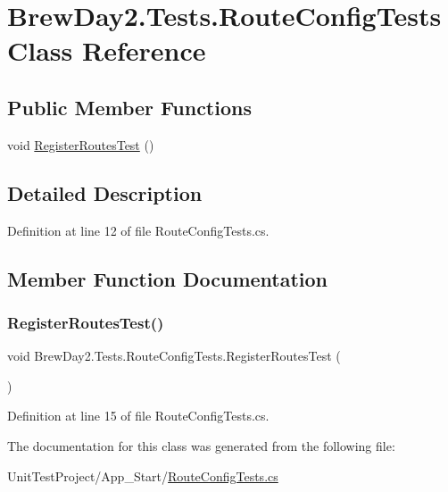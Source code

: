 \hypertarget{class_brew_day2_1_1_tests_1_1_route_config_tests}{}\section{Brew\+Day2.\+Tests.\+Route\+Config\+Tests Class Reference}
\label{class_brew_day2_1_1_tests_1_1_route_config_tests}
\subsection*{Public Member Functions}
\begin{DoxyCompactItemize}
\item 
void \mbox{\hyperlink{class_brew_day2_1_1_tests_1_1_route_config_tests_a581e98e6b671f4631756ab6d1efae02e}{Register\+Routes\+Test}} ()
\end{DoxyCompactItemize}


\subsection{Detailed Description}


Definition at line 12 of file Route\+Config\+Tests.\+cs.



\subsection{Member Function Documentation}
\mbox{\label{class_brew_day2_1_1_tests_1_1_route_config_tests_a581e98e6b671f4631756ab6d1efae02e}} 
\subsubsection{\texorpdfstring{Register\+Routes\+Test()}{RegisterRoutesTest()}}
{\footnotesize\ttfamily void Brew\+Day2.\+Tests.\+Route\+Config\+Tests.\+Register\+Routes\+Test (\begin{DoxyParamCaption}{ }\end{DoxyParamCaption})}



Definition at line 15 of file Route\+Config\+Tests.\+cs.



The documentation for this class was generated from the following file\+:\begin{DoxyCompactItemize}
\item 
Unit\+Test\+Project/\+App\+\_\+\+Start/\mbox{\hyperlink{_route_config_tests_8cs}{Route\+Config\+Tests.\+cs}}\end{DoxyCompactItemize}

